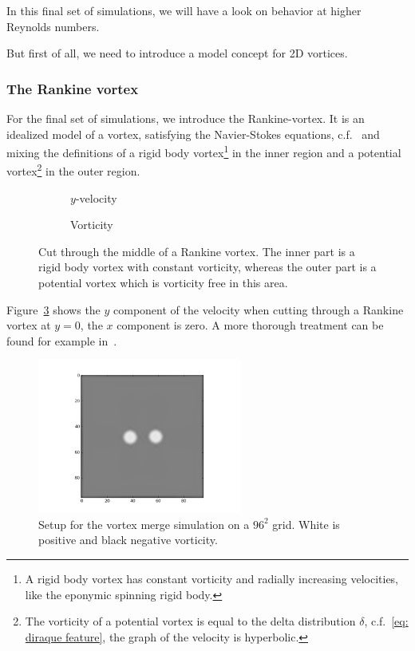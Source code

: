 
In this final set of simulations, we will have a look on behavior at higher Reynolds numbers.

But first of all, we need to introduce a model concept for 2D vortices.

\subsubsection{The Rankine vortex}
\label{subs:The Rankine vortex}

For the final set of simulations, we introduce the Rankine-vortex.
It is an idealized model of a vortex, satisfying the Navier-Stokes equations, c.f.~\cite{tryggeson2007analytical} and mixing the definitions of a rigid body vortex\footnote{A rigid body vortex has constant vorticity and radially increasing velocities, like the eponymic spinning rigid body.}
in the inner region and a potential vortex\footnote{The vorticity of a potential vortex is equal to the delta distribution $\delta$, c.f.~\eqref{eq: diraque feature}, the graph of the velocity is hyperbolic.} in the outer region.


\begin{figure}
\centering
\begin{subfigure}[b]{.5\textwidth}
  \centering
  
  \caption{$y$-velocity}
\label{fig: rankine}
\end{subfigure}%
\begin{subfigure}[b]{.5\textwidth}
  \centering
  
  \caption{Vorticity}
\label{fig: rankine vorticity}
\end{subfigure}
\caption{Cut through the middle of a Rankine vortex.
The inner part is a rigid body vortex with constant vorticity, whereas the outer part is a potential vortex which is vorticity free in this area.}
\label{fig: rankine}
\end{figure}

Figure~\ref{fig: rankine} shows the $y$ component of the velocity when cutting through a Rankine vortex at $y=0$, the $x$ component is zero.
A more thorough treatment can be found for example in~\cite{giaiotti2006rankine}.

\begin{figure}
  \centering
  \includegraphics[width=0.6\textwidth]{../figures/rankine_vortex.png}  %
  \caption{Setup for the vortex merge simulation on a $96^2$ grid. White is positive and black negative vorticity.}
\label{fig: vortex merge setup}
\end{figure}

